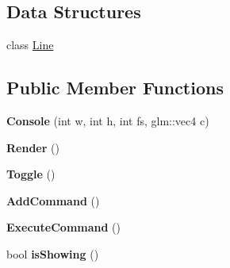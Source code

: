 \subsection*{Data Structures}
\begin{DoxyCompactItemize}
\item 
class \hyperlink{class_console_1_1_line}{Line}
\end{DoxyCompactItemize}
\subsection*{Public Member Functions}
\begin{DoxyCompactItemize}
\item 
{\bfseries Console} (int w, int h, int fs, glm\+::vec4 c)\hypertarget{class_console_a15b54426649b02aabfc85d7abd800bc8}{}\label{class_console_a15b54426649b02aabfc85d7abd800bc8}

\item 
{\bfseries Render} ()\hypertarget{class_console_a885dd5651b11c34e24800fc574eb583f}{}\label{class_console_a885dd5651b11c34e24800fc574eb583f}

\item 
{\bfseries Toggle} ()\hypertarget{class_console_a3de86c2d04f5acdae65832c82b56b1ec}{}\label{class_console_a3de86c2d04f5acdae65832c82b56b1ec}

\item 
{\bfseries Add\+Command} ()\hypertarget{class_console_a10e1942df8cf654f330b808f4b88c7f8}{}\label{class_console_a10e1942df8cf654f330b808f4b88c7f8}

\item 
{\bfseries Execute\+Command} ()\hypertarget{class_console_a37444eaccb8b549612a0b0a6820e7a35}{}\label{class_console_a37444eaccb8b549612a0b0a6820e7a35}

\item 
bool {\bfseries is\+Showing} ()\hypertarget{class_console_af3841ee0141e0fef631021f68cc05cf3}{}\label{class_console_af3841ee0141e0fef631021f68cc05cf3}

\end{DoxyCompactItemize}
